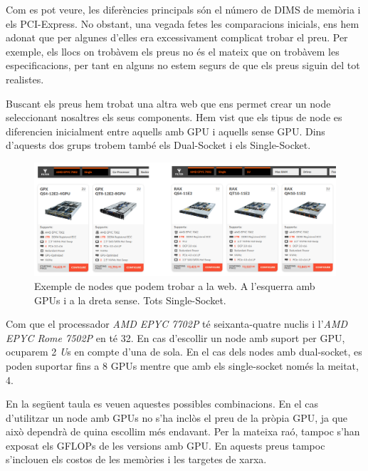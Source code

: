 Com es pot veure, les diferències principals són el número de DIMS de memòria i els PCI-Express. No obstant, una vegada fetes les comparacions inicials, ens hem adonat que per algunes d'elles era excessivament complicat trobar el preu. Per exemple, els llocs on trobàvem els preus no és el mateix que on trobàvem les especificacions, per tant en alguns no estem segurs de que els preus siguin del tot realistes.

Buscant els preus hem trobat una altra web \cite{webnodes} que ens permet crear un node seleccionant nosaltres els seus components. Hem vist que els tipus de node es diferencien inicialment entre aquells amb GPU i aquells sense GPU. Dins d'aquests dos grups trobem també els Dual-Socket i els Single-Socket.

\begin{figure}[H]
    \centering
    \includegraphics[width=\textwidth]{img/webnodes.png}
    \caption{Exemple de nodes que podem trobar a la web. A l'esquerra amb GPUs i a la dreta sense. Tots Single-Socket.}
\end{figure}

Com que el processador \textit{AMD EPYC 7702P} té seixanta-quatre nuclis i l'\textit{AMD EPYC Rome 7502P} en té 32. En cas d'escollir un node amb suport per GPU, ocuparem 2 \textit{U}s en compte d'una de sola. En el cas dels nodes amb dual-socket, es poden suportar fins a 8 GPUs mentre que amb els single-socket només la meitat, 4.

En la següent taula es veuen aquestes possibles combinacions. En el cas d'utilitzar un node amb GPUs no s'ha inclòs el preu de la pròpia GPU, ja que això dependrà de quina escollim més endavant. Per la mateixa raó, tampoc s'han exposat els GFLOPs de les versions amb GPU. En aquests preus tampoc s'inclouen els costos de les memòries i les targetes de xarxa.

